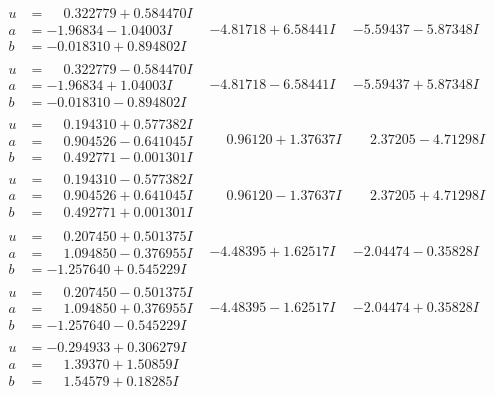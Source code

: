 \documentclass[1p]{elsarticle_modified}
\theoremstyle{definition}
\begin{document}
$$\begin{array}{c|c|c}
\begin{aligned}
u &= \phantom{-}0.322779 + 0.584470 I \\
a &= -1.96834 - 1.04003 I \\
b &= -0.018310 + 0.894802 I\end{aligned}
 & -4.81718 + 6.58441 I & -5.59437 - 5.87348 I \\ \hline\begin{aligned}
u &= \phantom{-}0.322779 - 0.584470 I \\
a &= -1.96834 + 1.04003 I \\
b &= -0.018310 - 0.894802 I\end{aligned}
 & -4.81718 - 6.58441 I & -5.59437 + 5.87348 I \\ \hline\begin{aligned}
u &= \phantom{-}0.194310 + 0.577382 I \\
a &= \phantom{-}0.904526 - 0.641045 I \\
b &= \phantom{-}0.492771 - 0.001301 I\end{aligned}
 & \phantom{-}0.96120 + 1.37637 I & \phantom{-}2.37205 - 4.71298 I \\ \hline\begin{aligned}
u &= \phantom{-}0.194310 - 0.577382 I \\
a &= \phantom{-}0.904526 + 0.641045 I \\
b &= \phantom{-}0.492771 + 0.001301 I\end{aligned}
 & \phantom{-}0.96120 - 1.37637 I & \phantom{-}2.37205 + 4.71298 I \\ \hline\begin{aligned}
u &= \phantom{-}0.207450 + 0.501375 I \\
a &= \phantom{-}1.094850 - 0.376955 I \\
b &= -1.257640 + 0.545229 I\end{aligned}
 & -4.48395 + 1.62517 I & -2.04474 - 0.35828 I \\ \hline\begin{aligned}
u &= \phantom{-}0.207450 - 0.501375 I \\
a &= \phantom{-}1.094850 + 0.376955 I \\
b &= -1.257640 - 0.545229 I\end{aligned}
 & -4.48395 - 1.62517 I & -2.04474 + 0.35828 I \\ \hline\begin{aligned}
u &= -0.294933 + 0.306279 I \\
a &= \phantom{-}1.39370 + 1.50859 I \\
b &= \phantom{-}1.54579 + 0.18285 I\end{aligned}

\end{array}$$
\end{document}
